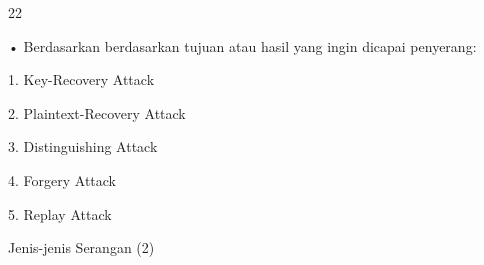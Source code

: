 \documentclass{article}
\begin{document}

22

• Berdasarkan berdasarkan tujuan atau hasil yang ingin dicapai penyerang:

   1. Key-Recovery Attack

   2. Plaintext-Recovery Attack

   3. Distinguishing Attack

 4.  Forgery Attack

   5. Replay Attack

Jenis-jenis Serangan (2)
\end{document}
